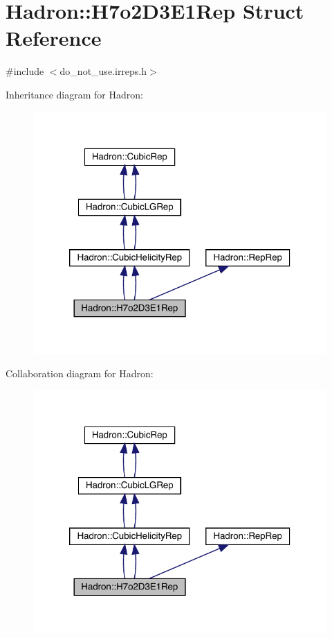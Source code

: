 \hypertarget{structHadron_1_1H7o2D3E1Rep}{}\section{Hadron\+:\+:H7o2\+D3\+E1\+Rep Struct Reference}
\label{structHadron_1_1H7o2D3E1Rep}


{\ttfamily \#include $<$do\+\_\+not\+\_\+use.\+irreps.\+h$>$}



Inheritance diagram for Hadron\+:\nopagebreak
\begin{figure}[H]
\begin{center}
\leavevmode
\includegraphics[width=320pt]{de/dec/structHadron_1_1H7o2D3E1Rep__inherit__graph}
\end{center}
\end{figure}


Collaboration diagram for Hadron\+:\nopagebreak
\begin{figure}[H]
\begin{center}
\leavevmode
\includegraphics[width=320pt]{d9/d3f/structHadron_1_1H7o2D3E1Rep__coll__graph}
\end{center}
\end{figure}
